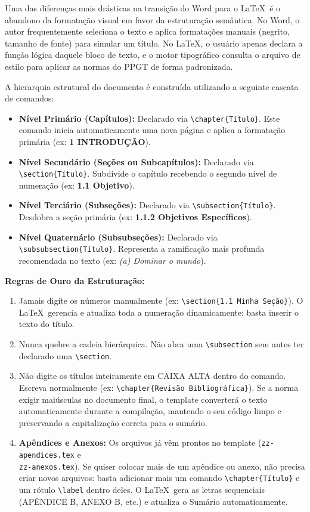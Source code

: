 \documentclass[12pt, a4paper]{article}
\begin{document}
Uma das diferenças mais drásticas na transição do Word para o \LaTeX \ é o abandono da formatação visual em favor da estruturação semântica. No Word, o autor frequentemente seleciona o texto e aplica formatações manuais (negrito, tamanho de fonte) para simular um título. No \LaTeX, o usuário apenas declara a função lógica daquele bloco de texto, e o motor tipográfico consulta o arquivo de estilo para aplicar as normas do PPGT de forma padronizada.

A hierarquia estrutural do documento é construída utilizando a seguinte cascata de comandos:

\begin{itemize}
    \item \textbf{Nível Primário (Capítulos):} Declarado via \texttt{\textbackslash chapter\{Título\}}. Este comando inicia automaticamente uma nova página e aplica a formatação primária (ex: \textbf{1 INTRODUÇÃO}).
    \item \textbf{Nível Secundário (Seções ou Subcapítulos):} Declarado via \texttt{\textbackslash section\{Título\}}. Subdivide o capítulo recebendo o segundo nível de numeração (ex: \textbf{1.1 Objetivo}).
    \item \textbf{Nível Terciário (Subseções):} Declarado via \texttt{\textbackslash subsection\{Título\}}. Desdobra a seção primária (ex: \textbf{1.1.2 Objetivos Específicos}).
    \item \textbf{Nível Quaternário (Subsubseções):} Declarado via \texttt{\textbackslash subsubsection\{Título\}}. Representa a ramificação mais profunda recomendada no texto (ex: \textit{(a) Dominar o mundo}).
\end{itemize}

\textbf{Regras de Ouro da Estruturação:}
\begin{enumerate}
    \item Jamais digite os números manualmente (ex: \texttt{\textbackslash section\{1.1 Minha Seção\}}). O \LaTeX \ gerencia e atualiza toda a numeração dinamicamente; basta inserir o texto do título.
    \item Nunca quebre a cadeia hierárquica. Não abra uma \texttt{\textbackslash subsection} sem antes ter declarado uma \texttt{\textbackslash section}.
    \item Não digite os títulos inteiramente em CAIXA ALTA dentro do comando. Escreva normalmente (ex: \texttt{\textbackslash chapter\{Revisão Bibliográfica\}}). Se a norma exigir maiúsculas no documento final, o template converterá o texto automaticamente durante a compilação, mantendo o seu código limpo e preservando a capitalização correta para o sumário.
    \item \textbf{Apêndices e Anexos:} Os arquivos já vêm prontos no template (\texttt{zz-apendices.tex} e \\ \texttt{zz-anexos.tex}). Se quiser colocar mais de um apêndice ou anexo, não precisa criar novos arquivos: basta adicionar mais um comando \texttt{\textbackslash chapter\{Título\}} e um rótulo \texttt{\textbackslash label} dentro deles. O \LaTeX \ gera as letras sequenciais (APÊNDICE B, ANEXO B, etc.) e atualiza o Sumário automaticamente.
\end{enumerate}
\end{document}
